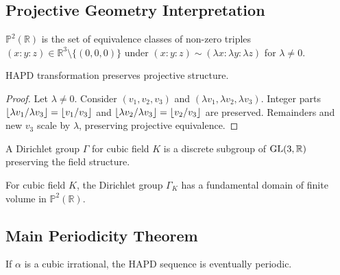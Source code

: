 \begin{theorem}
\subsection{Projective Geometry Interpretation}

\begin{definition}
$\mathbb{P}^2(\mathbb{R})$ is the set of equivalence classes of non-zero triples $(x : y : z) \in \mathbb{R}^3 \setminus \{(0,0,0)\}$ under $(x : y : z) \sim (\lambda x : \lambda y : \lambda z)$ for $\lambda \neq 0$.
\end{definition}

\begin{proposition}\label{prop:projective_invariance}
HAPD transformation preserves projective structure.
\end{proposition}

\begin{proof}
Let $\lambda \neq 0$. Consider $(v_1, v_2, v_3)$ and $(\lambda v_1, \lambda v_2, \lambda v_3)$. Integer parts $\lfloor \lambda v_1/\lambda v_3 \rfloor = \lfloor v_1/v_3 \rfloor$ and $\lfloor \lambda v_2/\lambda v_3 \rfloor = \lfloor v_2/v_3 \rfloor$ are preserved. Remainders and new $v_3$ scale by $\lambda$, preserving projective equivalence.
\end{proof}

\begin{definition}
A Dirichlet group $\Gamma$ for cubic field $K$ is a discrete subgroup of $\operatorname{GL}(3,\mathbb{R})$ preserving the field structure.
\end{definition}

\begin{theorem}\label{thm:finite_domain}
For cubic field $K$, the Dirichlet group $\Gamma_K$ has a fundamental domain of finite volume in $\mathbb{P}^2(\mathbb{R})$.
\end{theorem}

\subsection{Main Periodicity Theorem}

\begin{theorem}\label{thm:cubic_periodic}
If $\alpha$ is a cubic irrational, the HAPD sequence is eventually periodic.
\end{theorem}


\end{theorem}
